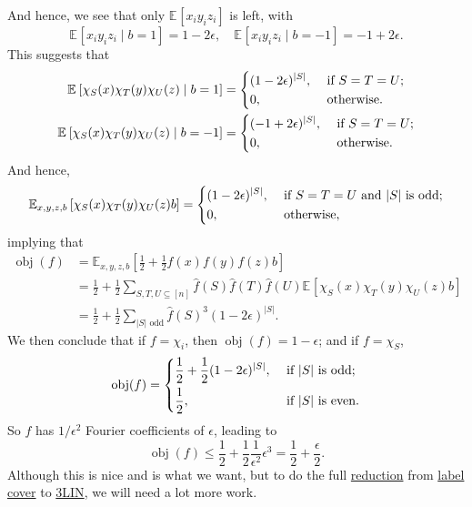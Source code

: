 And hence, we see that only \(\mathbb{E}_{}\left[x_i y_i z_i \right] \) is left, with
\[
	\mathbb{E}_{}\left[x_i y_i z_i \mid b= 1 \right] = 1 - 2\epsilon,
	\quad \mathbb{E}_{}\left[x_i y_i z_i \mid b= -1 \right] = -1 + 2\epsilon.
\]
This suggests that
\[
	\begin{split}
		\mathbb{E}_{}\left[\chi _S(x) \chi _T(y) \chi _U(z) \mid b=1 \right] &= \begin{dcases}
			(1-2\epsilon )^{\vert S \vert }, & \text{ if } S=T=U ;  \\
			0,                               & \text{ otherwise}  .
		\end{dcases}\\
		\mathbb{E}_{}\left[\chi _S(x) \chi _T(y) \chi _U(z) \mid b=-1 \right] &= \begin{dcases}
			(-1+2\epsilon )^{\vert S \vert }, & \text{ if } S=T=U ;  \\
			0,                                & \text{ otherwise}  .
		\end{dcases}
	\end{split}
\]
And hence,
\[
	\mathbb{E}_{x, y, z, b}\left[\chi _S(x) \chi _T(y) \chi _U(z) b \right] = \begin{dcases}
		(1 - 2\epsilon )^{\vert S \vert }, & \text{ if } S=T=U \text{ and \(\vert S \vert \) is odd}; \\
		0,                                 & \text{ otherwise} ,
	\end{dcases}
\]
implying that
\[
	\begin{split}
		\mathop{\mathrm{obj}}(f)
		&= \mathbb{E}_{x, y, z, b}\left[\frac{1}{2} + \frac{1}{2} f(x) f(y) f(z) b \right] \\
		&= \frac{1}{2} + \frac{1}{2} \sum_{S, T, U \subseteq [n]} \hat{f} (S) \hat{f} (T) \hat{f} (U) \mathbb{E}_{}\left[\chi _S(x) \chi _T(y) \chi _U(z) b \right] \\
		&= \frac{1}{2} + \frac{1}{2} \sum_{\vert S \vert \text{ odd}} \hat{f} (S)^3 (1 - 2\epsilon )^{\vert S \vert }.
	\end{split}
\]
We then conclude that if \(f = \chi _i\), then \(\mathop{\mathrm{obj}}(f) = 1 - \epsilon \); and if \(f = \chi _S\),
\[
	\mathop{\mathrm{obj}}(f) = \begin{dcases}
		\frac{1}{2} + \frac{1}{2} (1-2\epsilon )^{\vert S \vert }, & \text{ if \(\vert S \vert \) is odd};  \\
		\frac{1}{2},                                               & \text{ if \(\vert S \vert \) is even}.
	\end{dcases}
\]
So \(f\) has \(1 / \epsilon ^2\) Fourier coefficients of \(\epsilon \), leading to
\[
	\mathop{\mathrm{obj}}(f) \leq \frac{1}{2} + \frac{1}{2}\frac{1}{\epsilon ^2} \epsilon ^3 = \frac{1}{2} + \frac{\epsilon}{2}.
\]
Although this is nice and is what we want, but to do the full \hyperref[def:reduction]{reduction} from \hyperref[prb:label-cover]{label cover} to \hyperref[prb:max-3LIN]{3LIN}, we will need a lot more work.

